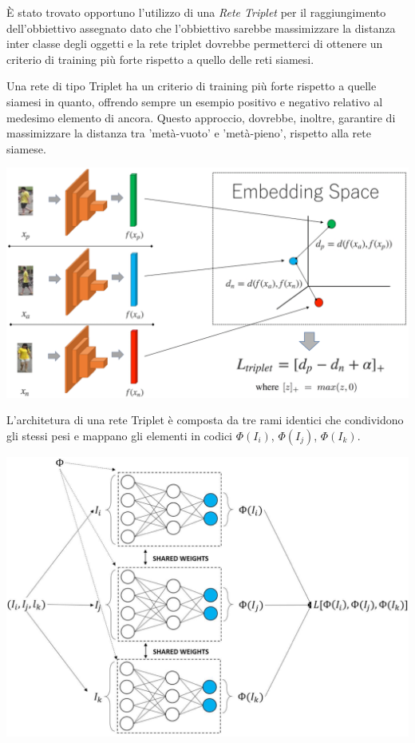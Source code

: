 \documentclass[11pt]{article}
\begin{document}
È stato trovato opportuno l'utilizzo di una \textit{Rete Triplet} per il raggiungimento
dell'obbiettivo assegnato dato che l'obbiettivo sarebbe massimizzare la distanza inter classe degli oggetti
e la rete triplet dovrebbe permetterci di ottenere un criterio di training più forte rispetto a quello
delle reti siamesi.

Una rete di tipo Triplet ha un criterio di training più forte rispetto a quelle siamesi in quanto, offrendo sempre un esempio positivo e negativo relativo
al medesimo elemento di ancora. Questo approccio, dovrebbe, inoltre, garantire di massimizzare la distanza
tra 'metà-vuoto' e 'metà-pieno', rispetto alla rete siamese.

\begin{center}
    \begin{minipage}{0.6\linewidth}
    \includegraphics[width=\linewidth]{01.png}
    \end{minipage}
\end{center}

L'architetura di una rete Triplet è composta da tre rami identici che condividono gli stessi pesi e mappano gli elementi in codici $\Phi(I_i)$, $\Phi(I_j)$, $\Phi(I_k)$.

\begin{center}
    \begin{minipage}{0.5\linewidth}
    \includegraphics[width=\linewidth]{02.png}
    \end{minipage}
\end{center}
\end{document}
